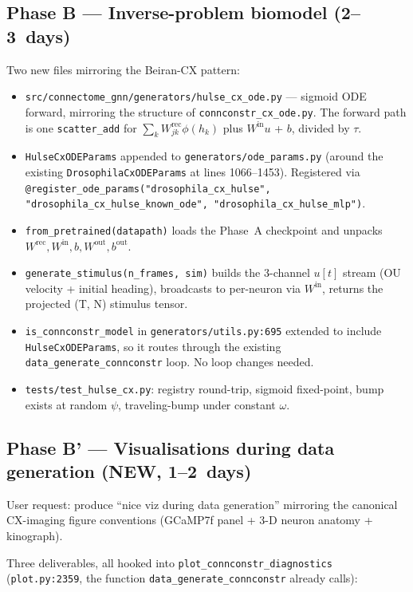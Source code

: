 \documentclass[11pt]{article}
\begin{document}
\subsection*{Phase B --- Inverse-problem biomodel (2--3~days)}

Two new files mirroring the Beiran-CX pattern:

\begin{itemize}[leftmargin=*]
\item \texttt{src/connectome\_gnn/generators/hulse\_cx\_ode.py} --- sigmoid
  ODE forward, mirroring the structure of
  \texttt{connconstr\_cx\_ode.py}. The forward path is one
  \texttt{scatter\_add} for $\sum_k W^{\text{rec}}_{jk}\phi(h_k)$ plus
  $W^{\text{in}}u$ + $b$, divided by $\tau$.
\item \texttt{HulseCxODEParams} appended to
  \texttt{generators/ode\_params.py} (around the existing
  \texttt{DrosophilaCxODEParams} at lines 1066--1453). Registered via
  \texttt{@register\_ode\_params("drosophila\_cx\_hulse", "drosophila\_cx\_hulse\_known\_ode", "drosophila\_cx\_hulse\_mlp")}.
\item \texttt{from\_pretrained(datapath)} loads the Phase~A checkpoint and
  unpacks $W^{\text{rec}}, W^{\text{in}}, b, W^{\text{out}}, b^{\text{out}}$.
\item \texttt{generate\_stimulus(n\_frames, sim)} builds the 3-channel
  $u[t]$ stream (OU velocity + initial heading), broadcasts to per-neuron
  via $W^{\text{in}}$, returns the projected (T, N) stimulus tensor.
\item \texttt{is\_connconstr\_model} in
  \texttt{generators/utils.py:695} extended to include
  \texttt{HulseCxODEParams}, so it routes through the existing
  \texttt{data\_generate\_connconstr} loop. No loop changes needed.
\item \texttt{tests/test\_hulse\_cx.py}: registry round-trip, sigmoid
  fixed-point, bump exists at random $\psi$, traveling-bump under
  constant $\omega$.
\end{itemize}

\subsection*{Phase B' --- Visualisations during data generation (NEW, 1--2~days)}

User request: produce ``nice viz during data generation'' mirroring the
canonical CX-imaging figure conventions (GCaMP7f panel + 3-D neuron
anatomy + kinograph).

Three deliverables, all hooked into
\texttt{plot\_connconstr\_diagnostics}
(\texttt{plot.py:2359}, the function \texttt{data\_generate\_connconstr}
already calls):
\end{document}

